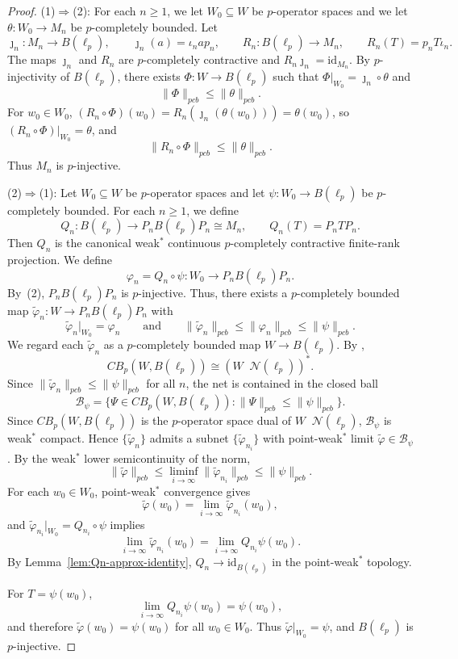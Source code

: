 \documentclass[12pt]{article}
\newcommand{\pcb}{pcb}
\newcommand{\CBp}{CB_p}
\newcommand{\otimesp}{\mathop{\overset{\wedge p}{\otimes}}}
\begin{document}
\begin{proof}
(1)$\Rightarrow$(2):
For each $n\geq 1$, we let $W_0\subseteq W$ be $p$-operator spaces and we let
$\theta:W_0\to M_n$ be $p$-completely bounded.
Let
\[
        \jmath_n:M_n\to B(\ell_p),\qquad \jmath_n(a)=\iota_n a p_n,
        \qquad
        R_n:B(\ell_p)\to M_n,\qquad R_n(T)=p_nT\iota_n.
\]
The maps $\jmath_n$ and $R_n$ are $p$-completely contractive and
$R_n\jmath_n=\mathrm{id}_{M_n}$.
By $p$-injectivity of $B(\ell_p)$, there exists $\Phi:W\to B(\ell_p)$ such that
$\Phi|_{W_0}=\jmath_n\circ\theta$ and
\[
        \|\Phi\|_{\pcb}\leq\|\theta\|_{\pcb}.
\]
For $w_0\in W_0$, $(R_n\circ\Phi)(w_0)=R_n(\jmath_n(\theta(w_0)))=\theta(w_0)$, so
$(R_n\circ\Phi)|_{W_0}=\theta$, and
\[
        \|R_n\circ\Phi\|_{\pcb}\leq\|\theta\|_{\pcb}.
\]
Thus $M_n$ is $p$-injective.

(2)$\Rightarrow$(1):
Let $W_0\subseteq W$ be $p$-operator spaces and let
$\psi:W_0\to B(\ell_p)$ be $p$-completely bounded.
For each $n\geq 1$, we define
\[
        Q_n:B(\ell_p)\to P_n B(\ell_p) P_n \cong M_n,\qquad Q_n(T)=P_nTP_n.
\]
Then $Q_n$ is the canonical weak$^*$ continuous $p$-completely contractive
finite-rank projection.
We define
\[
        \varphi_n=Q_n\circ\psi:W_0\to P_n B(\ell_p) P_n.
\]
By~(2), $P_n B(\ell_p) P_n$ is $p$-injective.
Thus, there exists a $p$-completely bounded map
$\widetilde\varphi_n:W\to P_n B(\ell_p) P_n$ with
\[
        \widetilde\varphi_n|_{W_0}=\varphi_n
        \qquad\text{and}\qquad
        \|\widetilde\varphi_n\|_{\pcb}\leq\|\varphi_n\|_{\pcb}\leq\|\psi\|_{\pcb}.
\]
We regard each $\widetilde\varphi_n$ as a $p$-completely bounded map $W\to B(\ell_p)$.
By \cite[Proposition~4.9]{Daws2007},
\[
        \CBp(W,B(\ell_p))\cong (W\otimesp \mathcal{N}(\ell_p))^*.
\]
Since $\|\widetilde\varphi_n\|_{\pcb}\leq\|\psi\|_{\pcb}$ for all $n$, the net is contained in the closed ball
\[
        \mathcal{B}_\psi=\{\Psi\in\CBp(W,B(\ell_p)):\|\Psi\|_{\pcb}\leq\|\psi\|_{\pcb}\}.
\]
Since $\CBp(W,B(\ell_p))$ is the $p$-operator space dual of $W\otimesp \mathcal{N}(\ell_p)$,
$\mathcal{B}_\psi$ is weak$^*$ compact.
Hence $\{\widetilde\varphi_n\}$ admits a subnet $\{\widetilde\varphi_{n_i}\}$ with point-weak$^*$ limit
$\widetilde\varphi\in\mathcal{B}_\psi$.
By the weak$^*$ lower semicontinuity of the norm,
\[
        \|\widetilde\varphi\|_{\pcb}\leq\liminf_{i\to\infty}\|\widetilde\varphi_{n_i}\|_{\pcb}\leq\|\psi\|_{\pcb}.
\]
For each $w_0\in W_0$, point-weak$^*$ convergence gives
\[
        \widetilde\varphi(w_0)=\lim_{i\to\infty}\widetilde\varphi_{n_i}(w_0),
\]
and $\widetilde\varphi_{n_i}|_{W_0}=Q_{n_i}\circ\psi$ implies
\[
        \lim_{i\to\infty}\widetilde\varphi_{n_i}(w_0)
        =\lim_{i\to\infty}Q_{n_i}\psi(w_0).
\]
By Lemma~\ref{lem:Qn-approx-identity}, $Q_n\to\mathrm{id}_{B(\ell_p)}$ in the point-weak$^*$ topology.

For $T=\psi(w_0)$,
\[
        \lim_{i\to\infty}Q_{n_i}\psi(w_0)=\psi(w_0),
\]
and therefore $\widetilde\varphi(w_0)=\psi(w_0)$ for all $w_0\in W_0$.
Thus $\widetilde\varphi|_{W_0}=\psi$, and $B(\ell_p)$ is $p$-injective.
\end{proof}
\end{document}
